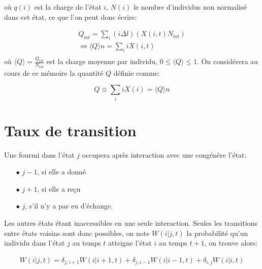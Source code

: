 où $q(i)$ est la charge de l'état $i$, $N(i)$ le nombre d'individus non normalisé dans cet état, ce que l'on peut donc écrire:

\begin{equation}
\begin{aligned}
Q_{tot}	= \sum_i (i \Delta l) (X(i,t) N_{tot})\\
\Leftrightarrow \langle Q \rangle  n = \sum_i i X(i,t)\\
\end{aligned}
\end{equation}
où $\langle Q \rangle = \frac{Q_{tot}}{N_{tot}}$ est la charge moyenne par individu, $0 \leq \langle Q \rangle \leq 1$. On considérera au cours de ce mémoire la quantité $Q$ définie comme:

\begin{equation}
Q \equiv \sum_i i X(i) = \langle Q \rangle n
\end{equation}



\section{Taux de transition}
Une fourmi dans l'état $j$ occupera après interaction avec une congénère l'état:
\begin{itemize}
\item[$\bullet$] $j-1$, si elle a donné
\item[$\bullet$] $j+1$, si elle a reçu
\item[$\bullet$] $j$, s'il n'y a pas eu d'échange.
\end{itemize}
Les autres états étant inaccessibles en une seule interaction. Seules les transitions entre états voisins sont donc possibles, on note $W(i|j,t)$ la probabilité qu'un individu dans l'état $j$ au temps $t$ atteigne l'état $i$ au temps $t+1$, on trouve alors:


\begin{equation}
\begin{aligned}
W(i|j,t) = \delta_{j,i+1} W(i|i+1,t) + \delta_{j,i-1} W(i|i-1,t) + \delta_{i,j} W(i|i,t)\\
\label{Wij}
\end{aligned}
\end{equation}


